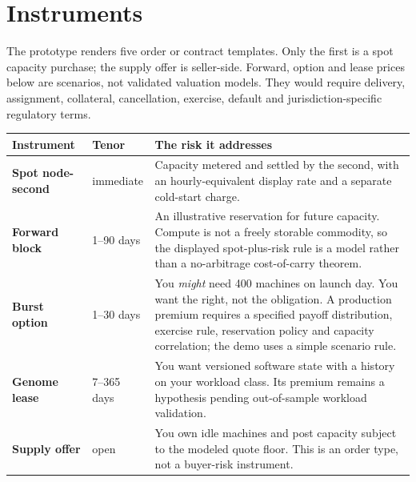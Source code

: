 \documentclass[11pt,letterpaper]{article}
\begin{document}
\newpage

\section{Instruments}

The prototype renders five order or contract templates. Only the first is a
spot capacity purchase; the supply offer is seller-side. Forward, option and
lease prices below are scenarios, not validated valuation models. They would
require delivery, assignment, collateral, cancellation, exercise, default and
jurisdiction-specific regulatory terms.

\begin{center}
\renewcommand{\arraystretch}{1.5}
\begin{tabular}{@{}p{} p{} p{}@{}}
\toprule
\textbf{Instrument} & \textbf{Tenor} & \textbf{The risk it addresses} \\
\midrule
\textbf{Spot node-second} & immediate &
Capacity metered and settled by the second, with an hourly-equivalent display
rate and a separate cold-start charge.\\

\textbf{Forward block} & 1--90 days &
An illustrative reservation for future capacity. Compute is not a freely
storable commodity, so the displayed spot-plus-risk rule is a model rather than
a no-arbitrage cost-of-carry theorem.\\

\textbf{Burst option} & 1--30 days &
You \emph{might} need 400 machines on launch day. You want the right, not the
obligation. A production premium requires a specified payoff distribution,
exercise rule, reservation policy and capacity correlation; the demo uses a
simple scenario rule.\\

\textbf{Genome lease} & 7--365 days &
You want versioned software state with a history on your workload class. Its
premium remains a hypothesis pending out-of-sample workload validation.\\

\textbf{Supply offer} & open &
You own idle machines and post capacity subject to the modeled quote floor.
This is an order type, not a buyer-risk instrument.\\
\bottomrule
\end{tabular}
\end{center}
\end{document}
